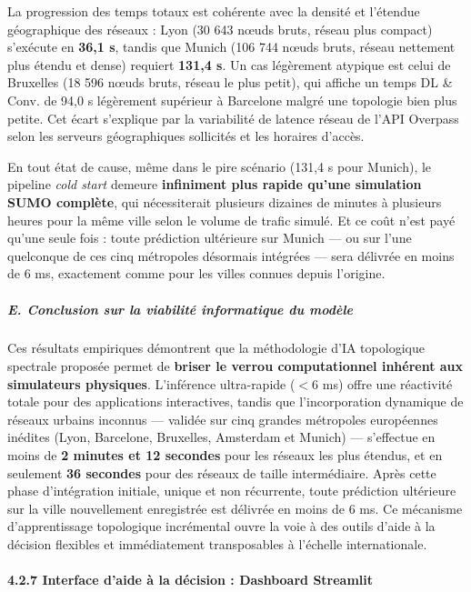 \documentclass[10pt, a4paper]{article}
\begin{document}
La progression des temps totaux est cohérente avec la densité et
l'étendue géographique des réseaux : Lyon (30 643 nœuds bruts, réseau
plus compact) s'exécute en \textbf{36,1 s}, tandis que Munich (106 744
nœuds bruts, réseau nettement plus étendu et dense) requiert
\textbf{131,4 s}. Un cas légèrement atypique est celui de Bruxelles (18
596 nœuds bruts, réseau le plus petit), qui affiche un temps DL \& Conv.
de 94,0 s légèrement supérieur à Barcelone malgré une topologie bien
plus petite. Cet écart s'explique par la variabilité de latence réseau
de l'API Overpass selon les serveurs géographiques sollicités et les
horaires d'accès.

En tout état de cause, même dans le pire scénario (131,4 s pour Munich),
le pipeline \emph{cold start} demeure \textbf{infiniment plus rapide
qu'une simulation SUMO complète}, qui nécessiterait plusieurs dizaines
de minutes à plusieurs heures pour la même ville selon le volume de
trafic simulé. Et ce coût n'est payé qu'une seule fois : toute
prédiction ultérieure sur Munich --- ou sur l'une quelconque de ces cinq
métropoles désormais intégrées --- sera délivrée en moins de 6 ms,
exactement comme pour les villes connues depuis l'origine.

\subparagraph{E. Conclusion sur la viabilité informatique du
modèle}\label{e.-conclusion-sur-la-viabilituxe9-informatique-du-moduxe8le}

Ces résultats empiriques démontrent que la méthodologie d'IA topologique
spectrale proposée permet de \textbf{briser le verrou computationnel
inhérent aux simulateurs physiques}. L'inférence ultra-rapide (\(<6\)
ms) offre une réactivité totale pour des applications interactives,
tandis que l'incorporation dynamique de réseaux urbains inconnus ---
validée sur cinq grandes métropoles européennes inédites (Lyon,
Barcelone, Bruxelles, Amsterdam et Munich) --- s'effectue en moins de
\textbf{2 minutes et 12 secondes} pour les réseaux les plus étendus, et
en seulement \textbf{36 secondes} pour des réseaux de taille
intermédiaire. Après cette phase d'intégration initiale, unique et non
récurrente, toute prédiction ultérieure sur la ville nouvellement
enregistrée est délivrée en moins de 6 ms. Ce mécanisme d'apprentissage
topologique incrémental ouvre la voie à des outils d'aide à la décision
flexibles et immédiatement transposables à l'échelle internationale.

\paragraph{4.2.7 Interface d'aide à la décision : Dashboard
Streamlit}\label{interface-daide-uxe0-la-duxe9cision-dashboard-streamlit}
\end{document}
